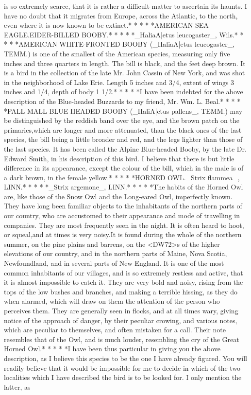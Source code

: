 \documentclass[a4paper]{article}
\begin{document}
is so extremely scarce, that it is rather a difficult matter to ascertain its haunts. I have no doubt that it migrates from Europe, across the Atlantic, to the north, even where it is now known to be extinct.*       *       *       *       *AMERICAN SEA-EAGLE.EIDER-BILLED BOOBY.*       *       *       *       *_HaliaA|etus leucogaster_, Wils.*       *       *       *       *AMERICAN WHITE-FRONTED BOOBY (_HaliaA|etus leucogaster_, TEMM.) is one of the smallest of the American species, measuring only five inches and three quarters in length. The bill is black, and the feet deep brown. It is a bird in the collection of the late Mr. John Cassin of New York, and was shot in the neighborhood of Lake Erie. Length 5 inches and 3/4, extent of wings 3 inches and 1/4, depth of body 1 1/2.*       *       *       *       *I have been indebted for the above description of the Blue-headed Buzzards to my friend, Mr. Wm. L. Beal.*       *       *       *       *PALL MALL BLUE-HEADED BOOBY (_HaliA|etus pallens_, TEMM.) may be distinguished by the reddish band over the eye, and the brown patch on the primaries,which are longer and more attenuated, than the black ones of the last species, the bill being a little broader and red, and the legs lighter than those of the last species. It has been called the Alpine Blue-headed Booby, by the late Dr. Edward Smith, in his description of this bird. I believe that there is but little difference in its appearance, except the colour of the bill, which in the male is of a dark brown, in the female yellow.*       *       *       *       *HORNED OWL._Strix flammea_, LINN.*       *       *       *       *_Strix argemone_, LINN.*       *       *       *       *The habits of the Horned Owl are, like those of the Snow Owl and the Long-eared Owl, imperfectly known. They have long been familiar objects to the inhabitants of the northern parts of our country, who are accustomed to their appearance and mode of travelling in companies. They are most frequently seen in the night. It is often heard to hoot, or squeal,and at times is very noisy.It is found during the whole of the northern summer, on the pine plains and barrens, on the <DW72>s of the higher elevations of our country, and in the northern parts of Maine, Nova Scotia, Newfoundland, and in several parts of New England. It is one of the most common inhabitants of our villages, and is so extremely restless and active, that it is almost impossible to catch it. They are very bold and noisy, rising from the tops of the low bushes and branches, and making a terrible hissing, as they do when alarmed, which will draw on them the attention of the person who perceives them. They are generally seen in flocks, and at all times wary, giving notice of the approach of danger, by their peculiar crowing, and various notes, which are peculiar to themselves, and often mistaken for a call. Their note resembles that of the Owl, and is much louder, resembling the cry of the Great Horned Owl.*       *       *       *       *I have been thus particular in giving you the above description, as I believe this species to be the one I have already figured. You will readily believe that it would be impossible for me to decide in which of the two localities which I have described the bird is to be looked for. I only mention the latter, as 
\end{document}
